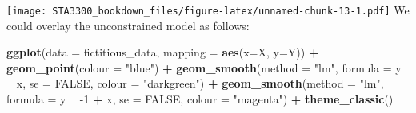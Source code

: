 \documentclass[
]{book}
\newenvironment{Shaded}{\begin{snugshade}}{\end{snugshade}}
\newcommand{\DataTypeTok}[1]{\textcolor[rgb]{0.13,0.29,0.53}{#1}}
\newcommand{\DecValTok}[1]{\textcolor[rgb]{0.00,0.00,0.81}{#1}}
\newcommand{\FloatTok}[1]{\textcolor[rgb]{0.00,0.00,0.81}{#1}}
\newcommand{\KeywordTok}[1]{\textcolor[rgb]{0.13,0.29,0.53}{\textbf{#1}}}
\newcommand{\NormalTok}[1]{#1}
\newcommand{\OperatorTok}[1]{\textcolor[rgb]{0.81,0.36,0.00}{\textbf{#1}}}
\newcommand{\OtherTok}[1]{\textcolor[rgb]{0.56,0.35,0.01}{#1}}
\newcommand{\StringTok}[1]{\textcolor[rgb]{0.31,0.60,0.02}{#1}}
\begin{document}
\begin{Shaded}
\end{Shaded}

\texttt{[image: STA3300\_bookdown\_files/figure-latex/unnamed-chunk-13-1.pdf]}
We could overlay the unconstrained model as follows:

\begin{Shaded}
\begin{Highlighting}[]
\KeywordTok{ggplot}\NormalTok{(}\DataTypeTok{data =}\NormalTok{ fictitious_data,}
       \DataTypeTok{mapping =} \KeywordTok{aes}\NormalTok{(}\DataTypeTok{x=}\NormalTok{X, }\DataTypeTok{y=}\NormalTok{Y)) }\OperatorTok{+}
\StringTok{   }\KeywordTok{geom_point}\NormalTok{(}\DataTypeTok{colour =} \StringTok{"blue"}\NormalTok{) }\OperatorTok{+}
\StringTok{   }\KeywordTok{geom_smooth}\NormalTok{(}\DataTypeTok{method =} \StringTok{"lm"}\NormalTok{,}
               \DataTypeTok{formula =}\NormalTok{ y }\OperatorTok{~}\StringTok{ }\NormalTok{x,}
               \DataTypeTok{se =} \OtherTok{FALSE}\NormalTok{,}
               \DataTypeTok{colour =} \StringTok{"darkgreen"}\NormalTok{) }\OperatorTok{+}
\StringTok{   }\KeywordTok{geom_smooth}\NormalTok{(}\DataTypeTok{method =} \StringTok{"lm"}\NormalTok{,}
               \DataTypeTok{formula =}\NormalTok{ y }\OperatorTok{~}\StringTok{ }\DecValTok{-1} \OperatorTok{+}\StringTok{ }\NormalTok{x,}
               \DataTypeTok{se =} \OtherTok{FALSE}\NormalTok{,}
               \DataTypeTok{colour =} \StringTok{"magenta"}\NormalTok{) }\OperatorTok{+}
\StringTok{   }\KeywordTok{theme_classic}\NormalTok{()}
\end{Highlighting}
\end{Shaded}
\end{document}
